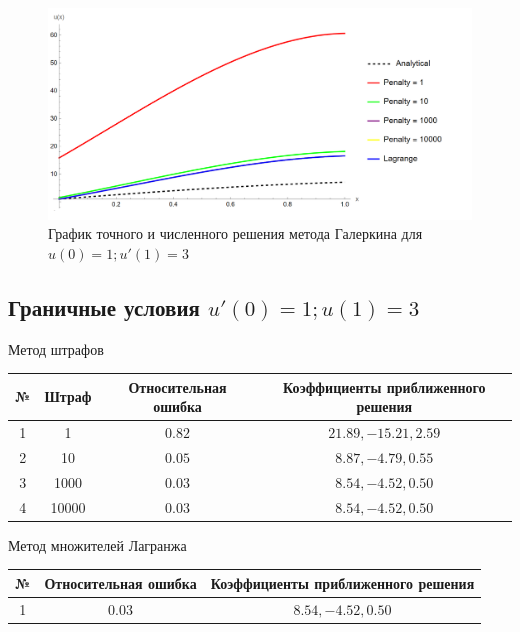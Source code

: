 \documentclass[12pt,a4paper]{article}
\begin{document}
\begin{figure}[h]
	\centering
	\includegraphics[width=1\textwidth]{m-2-2.PNG}
	\caption{График точного и численного решения метода Галеркина для $u(0) = 1; u'(1) = 3$}
\end{figure}

\subsection{Граничные условия $u'(0) = 1; u(1) = 3$}

\begin{center}
	Метод штрафов
	\begin{tabular}{|c|c|c|c|} 
		\hline
		№ & Штраф & Относительная ошибка & Коэффициенты приближенного решения \\ 
		\hline
		1 & 1 &$0.82$ & ${21.89,-15.21,2.59}$ \\ 
		\hline
		2 & 10 &$0.05$ & ${8.87,-4.79,0.55}$ \\ 
		\hline
		3 & 1000 &$0.03$ & ${8.54,-4.52,0.50}$ \\ 
		\hline
		4 & 10000 &$0.03$ & ${8.54,-4.52,0.50}$ \\ 
		\hline
	\end{tabular}
\end{center}

\begin{center}
	Метод множителей Лагранжа
	\begin{tabular}{|c|c|c|} 
		\hline
		№ & Относительная ошибка & Коэффициенты приближенного решения \\ 
		\hline
		1 & $0.03$ & ${8.54,-4.52,0.50}$ \\ 
		\hline
	\end{tabular}
\end{center}
\end{document}
